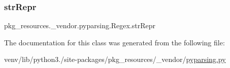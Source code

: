 \subsubsection{\texorpdfstring{str\+Repr}{strRepr}}
{\footnotesize\ttfamily pkg\+\_\+resources.\+\_\+vendor.\+pyparsing.\+Regex.\+str\+Repr}



The documentation for this class was generated from the following file\+:\begin{DoxyCompactItemize}
\item 
venv/lib/python3./site-\/packages/pkg\+\_\+resources/\+\_\+vendor/\hyperlink{pkg__resources_2__vendor_2pyparsing_8py}{pyparsing.\+py}\end{DoxyCompactItemize}
